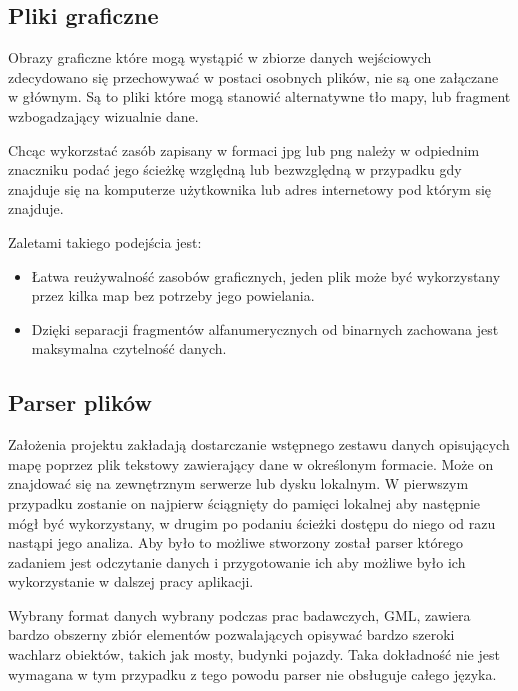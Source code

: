 \subsection{Pliki graficzne}
\label{subsec:plikigraficzne}

Obrazy graficzne które mogą wystąpić w zbiorze danych wejściowych zdecydowano się przechowywać w postaci osobnych plików, nie są one załączane w głównym. Są to pliki które mogą stanowić alternatywne tło mapy, lub fragment wzbogadzający wizualnie dane.

Chcąc wykorzstać zasób zapisany w formaci jpg lub png należy w odpiednim znaczniku podać jego ścieżkę względną lub bezwzględną w przypadku gdy znajduje się na komputerze użytkownika lub adres internetowy pod którym się znajduje.

Zaletami takiego podejścia jest:
\begin{itemize}

\item
Łatwa reużywalność zasobów graficznych, jeden plik może być wykorzystany przez kilka map bez potrzeby jego powielania.

\item
Dzięki separacji fragmentów alfanumerycznych od binarnych zachowana jest maksymalna czytelność danych.

\end{itemize}

\subsection{Parser plików}
\label{subsec:parser}

Założenia projektu zakładają dostarczanie wstępnego zestawu danych opisujących mapę poprzez plik tekstowy zawierający dane w określonym formacie. Może on znajdować się na zewnętrznym serwerze lub dysku lokalnym. W pierwszym przypadku zostanie on najpierw ściągnięty do pamięci lokalnej aby następnie mógł być wykorzystany, w drugim po podaniu ścieżki dostępu do niego  od razu nastąpi jego analiza. Aby było to możliwe stworzony został parser którego zadaniem jest odczytanie danych i przygotowanie ich aby możliwe było ich wykorzystanie w dalszej pracy aplikacji.

Wybrany format danych wybrany podczas prac badawczych, GML, zawiera bardzo obszerny zbiór elementów pozwalających opisywać bardzo szeroki wachlarz obiektów, takich jak mosty, budynki pojazdy. Taka dokładność nie jest wymagana w tym przypadku z tego powodu parser nie obsługuje całego języka.

